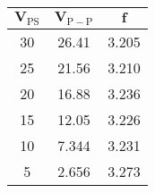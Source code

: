 \begin{tabular}{|c|c|c|}
	\hline
	$\boldsymbol{V_\mathrm{PS}}$ \tbf{(\si{\volt})} &
		$\boldsymbol{V_\mathrm{P-P}}$ \tbf{(\si{\volt})} &
			$\boldsymbol{f}$ \tbf{(\si{\kilo\hertz})} \\ \hline
	30		& 26.41		& 3.205 \\ \hline
	25		& 21.56		& 3.210 \\ \hline
	20		& 16.88		& 3.236 \\ \hline
	15		& 12.05		& 3.226 \\ \hline
	10		& 7.344		& 3.231 \\ \hline
	5		& 2.656		& 3.273 \\ \hline
\end{tabular}
